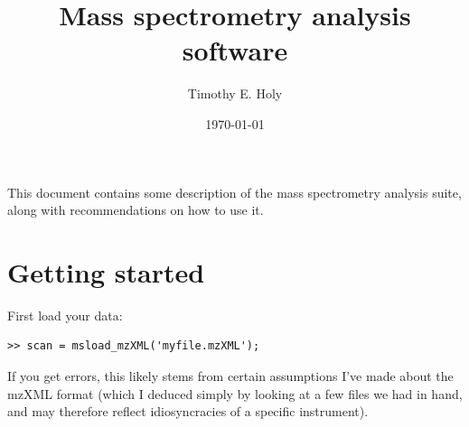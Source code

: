 \documentclass[notitlepage]{revtex4-1}
\newcommand{\matlab}{{\sc Matlab}}
\begin{document}
\title{Mass spectrometry analysis software}

\author{Timothy E. Holy}



\date{\today}


\maketitle

This document contains some description of the mass spectrometry analysis suite, along with recommendations on how to use it.


\section{Getting started}

First load your data:
\begin{verbatim}
>> scan = msload_mzXML('myfile.mzXML');
\end{verbatim}
If you get errors, this likely stems from certain assumptions I've made about the mzXML format (which I deduced simply by looking at a few files we had in hand, and may therefore reflect idiosyncracies of a specific instrument).  %
\end{document}
